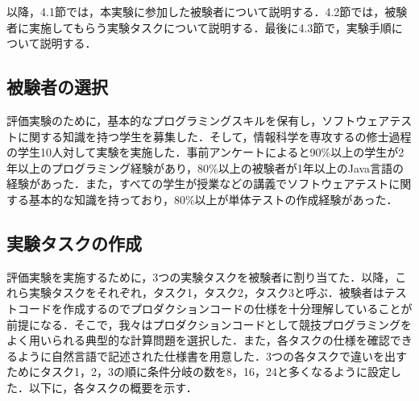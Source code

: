 \documentclass[12pt]{jarticle} %
\begin{document}
以降，4.1節では，本実験に参加した被験者について説明する．4.2節では，被験者に実施してもらう実験タスクについて説明する．最後に4.3節で，実験手順について説明する．

\subsection{被験者の選択}

評価実験のために，基本的なプログラミングスキルを保有し，ソフトウェアテストに関する知識を持つ学生を募集した．そして，情報科学を専攻するの修士過程の学生10人対して実験を実施した．事前アンケートによると90\%以上の学生が2年以上のプログラミング経験があり，80\%以上の被験者が1年以上のJava言語の経験があった．また，すべての学生が授業などの講義でソフトウェアテストに関する基本的な知識を持っており，80\%以上が単体テストの作成経験があった．

\subsection{実験タスクの作成}

評価実験を実施するために，3つの実験タスクを被験者に割り当てた．以降，これら実験タスクをそれぞれ，タスク1，タスク2，タスク3と呼ぶ．被験者はテストコードを作成するのでプロダクションコードの仕様を十分理解していることが前提になる．そこで，我々はプロダクションコードとして競技プログラミングをよく用いられる典型的な計算問題を選択した．また，各タスクの仕様を確認できるように自然言語で記述された仕様書を用意した．3つの各タスクで違いを出すためにタスク1，2，3の順に条件分岐の数を8，16，24と多くなるように設定した．以下に，各タスクの概要を示す．
\end{document}
